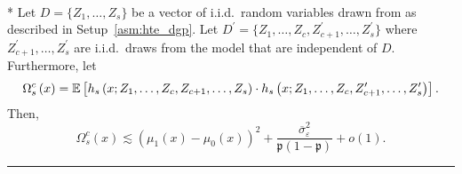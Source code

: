 \newpage
\begin{lem}\label{lem:CATE_omega_sc}\mbox{}\\*
	Let $D = \{Z_1, \dotsc, Z_{s}\}$ be a vector of i.i.d.\ random variables drawn from as described in Setup~\ref{asm:hte_dgp}.
	Let $D^{\prime} = \{Z_1, \dotsc, Z_{c}, Z_{c+1}^{\prime}, \dotsc,  Z_{s}^{\prime}\}$ where $Z_{c+1}^{\prime}, \dotsc,  Z_{s}^{\prime}$ are i.i.d.\ draws from the model that are independent of $D$.
	Furthermore, let
	\begin{equation}
		\Omega_{s}^{c}\left(x\right)
		= \mathbb{E}\left[h_{s}\left(x; Z_1, \ldots, Z_{c}, Z_{c+1}, \ldots, Z_{s}\right) \cdot
			h_{s}\left(x; Z_1, \ldots,Z_{c}, Z_{c+1}^{\prime}, \ldots, Z_{s}^{\prime}\right)\right].
	\end{equation}
	Then,
	\begin{equation}
		\Omega_{s}^{c}\left(x\right)
		\lesssim \left(\mu_{1}\left(x\right) - \mu_{0}\left(x\right)\right)^2
		+ \frac{\overline{\sigma}^2_{\varepsilon}}{\mathfrak{p}\left(1 - \mathfrak{p}\right)} + o(1).
	\end{equation}
\end{lem}
\hrule

